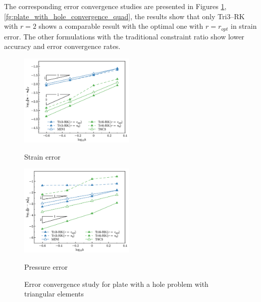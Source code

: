 The corresponding error convergence studies are presented in Figures \ref{fg:plate_with_hole_convergence}, \ref{fg:plate_with_hole_convergence_quad}, the results show that only Tri3--RK with $r=2$ shows a comparable result with the optimal one with $r=r_{opt}$ in strain error. The other formulations with the traditional constraint ratio show lower accuracy and error convergence rates.

\begin{figure}[H]
\centering
\begin{subcaptiongroup}
\centering
\parbox[b]{0.49\textwidth}{
    \includegraphics[width=0.49\textwidth]{png/plate_with_hole_Hdev_r1.png}
    \caption{Strain error}\label{fg:plate_with_hole_convergence_strain}
}
\parbox[b]{0.49\textwidth}{
    \includegraphics[width=0.49\textwidth]{png/plate_with_hole_L2_p_r1.png}
    \caption{Pressure error}\label{fg:plate_with_hole_convergence_pressure}
}
\end{subcaptiongroup}
\caption{Error convergence study for plate with a hole problem with triangular elements}\label{fg:plate_with_hole_convergence}
\end{figure}

